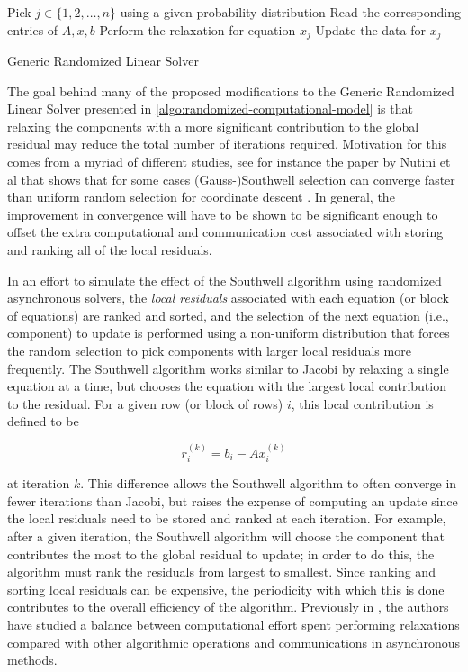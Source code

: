 \documentclass{article}
\theoremstyle{definition}
\theoremstyle{example}
\theoremstyle{example}
\theoremstyle{example}
\begin{document}
\begin{algorithm}[ht!]
	\DontPrintSemicolon
	 {
		 {
			Pick $j \in \{1, 2, \ldots, n\}$ using a given probability distribution \; \label{alg:pickrandom}
			Read the corresponding entries of $A, x, b$ \label{step:read}\;
			Perform the relaxation for equation $x_j$ \label{step:relax}\;
			Update the data for $x_j$ \;
		}
	}
	\caption{Generic Randomized Linear Solver}
	\label{algo:randomized-computational-model}
\end{algorithm}

The goal behind many of the proposed modifications to the Generic Randomized Linear Solver presented in \cref{algo:randomized-computational-model} is that relaxing the components with a more significant contribution to the global residual may reduce the total number of iterations required. Motivation for this comes from a myriad of different studies, see for instance the paper by Nutini et al that shows that for some cases (Gauss-)Southwell selection can converge faster than uniform random selection for coordinate descent \cite{nutini2015coordinate}. In general, the improvement in convergence will have to be shown to be significant enough to offset the extra computational and communication cost associated with storing and ranking all of the local residuals. 

In an effort to simulate the effect of the Southwell algorithm using randomized asynchronous solvers,  the {\em local residuals} associated with each equation (or block of equations) are ranked and sorted, and the selection of the next equation (i.e., component) to update is performed using a non-uniform distribution that forces the random selection to pick components with larger local residuals more frequently. The Southwell algorithm \cite{southwell1946relaxation} works similar to Jacobi by relaxing a single equation at a time, but chooses the equation with the largest local contribution to the residual. For a given row (or block of rows) $i$, this local contribution is defined to be

\begin{equation}
r_i^{(k)} = b_i - Ax_i^{(k)}
\end{equation}

\noindent
at iteration $k$. This difference allows the Southwell algorithm to often converge in fewer iterations than Jacobi, but raises the expense of computing an update since the local residuals need to be stored and ranked at each iteration. For example, after a given iteration, the Southwell algorithm will choose the component that contributes the most to the global residual to update; in order to do this, the algorithm must rank the residuals from largest to smallest. Since ranking and sorting local residuals can be expensive, the periodicity with which this is done contributes to the overall efficiency of the algorithm. Previously in \cite{jensen2018using}, the authors have studied a balance between computational effort spent performing relaxations compared with other algorithmic operations and communications in asynchronous methods.
\end{document}
